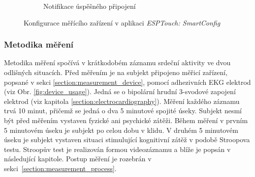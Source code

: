 \begin{figure}[h]
\begin{subfigure}[b]{0.45\textwidth}
        \textcolor{cyan}{\fboxrule=2pt\fboxsep=0pt}
        \caption{Notifikace úspěšného připojení}
        \label{fig:app_screen2}
    \end{subfigure}
    \caption{Konfigurace měřícího zařízení v aplikaci \textit{ESPTouch:
            SmartConfig}}
    \label{fig:esptouch_app}
\end{figure}

\subsubsection{Metodika měření}
\label{section:measurement_methodology}
Metodika měření spočívá v krátkodobém záznamu srdeční aktivity ve dvou odlišných
situacích. Před měřením je na subjekt připojeno měřicí zařízení, popsané v sekci
\ref{section:measurement_device}, pomocí adhezivních EKG elektrod (viz Obr.
\ref{fig:device_usage}). Jedná se o bipolární hrudní 3-svodové zapojení elektrod
(viz kapitola \ref{section:electrocardiography}). Měření každého záznamu trvá 10
minut, přičemž se jedná o dva 5 minutové spojité úseky. Subjekt nesmí být před
měřením vystaven fyzické ani psychické zátěži. Během měření v prvním 5 minutovém
úseku je subjekt po celou dobu v klidu. V druhém 5 minutovém úseku je subjekt
vystaven situaci stimulující kognitivní zátěž v podobě Stroopova testu. Stroopův
test je realizován formou videozáznamu a blíže je popsán v následující kapitole.
Postup měření je rozebrán v sekci~\ref{section:measurement_process}.

